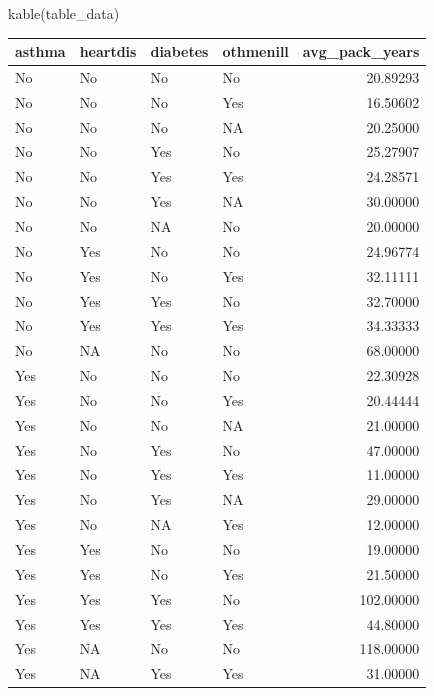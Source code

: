 \documentclass[
]{article}
\newenvironment{Shaded}{\begin{snugshade}}{\end{snugshade}}
\newcommand{\FunctionTok}[1]{\textcolor[rgb]{0.00,0.00,0.00}{#1}}
\newcommand{\NormalTok}[1]{#1}
\begin{document}
\begin{Shaded}
\begin{Highlighting}[]
\FunctionTok{kable}\NormalTok{(table\_data)}
\end{Highlighting}
\end{Shaded}

\begin{tabular}{l|l|l|l|r}
\hline
asthma & heartdis & diabetes & othmenill & avg\_pack\_years\\
\hline
No & No & No & No & 20.89293\\
\hline
No & No & No & Yes & 16.50602\\
\hline
No & No & No & NA & 20.25000\\
\hline
No & No & Yes & No & 25.27907\\
\hline
No & No & Yes & Yes & 24.28571\\
\hline
No & No & Yes & NA & 30.00000\\
\hline
No & No & NA & No & 20.00000\\
\hline
No & Yes & No & No & 24.96774\\
\hline
No & Yes & No & Yes & 32.11111\\
\hline
No & Yes & Yes & No & 32.70000\\
\hline
No & Yes & Yes & Yes & 34.33333\\
\hline
No & NA & No & No & 68.00000\\
\hline
Yes & No & No & No & 22.30928\\
\hline
Yes & No & No & Yes & 20.44444\\
\hline
Yes & No & No & NA & 21.00000\\
\hline
Yes & No & Yes & No & 47.00000\\
\hline
Yes & No & Yes & Yes & 11.00000\\
\hline
Yes & No & Yes & NA & 29.00000\\
\hline
Yes & No & NA & Yes & 12.00000\\
\hline
Yes & Yes & No & No & 19.00000\\
\hline
Yes & Yes & No & Yes & 21.50000\\
\hline
Yes & Yes & Yes & No & 102.00000\\
\hline
Yes & Yes & Yes & Yes & 44.80000\\
\hline
Yes & NA & No & No & 118.00000\\
\hline
Yes & NA & Yes & Yes & 31.00000\\
\hline
\end{tabular}

\newpage
\end{document}

